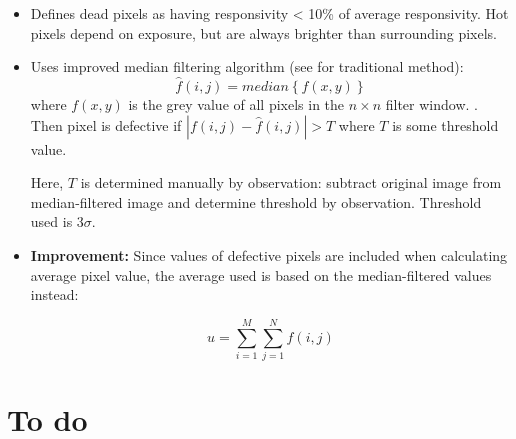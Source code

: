 \documentclass[10pt,fleqn]{article}
\begin{document}
\begin{itemize}
\item
Defines dead pixels as having responsivity < 10\% of average responsivity. Hot pixels depend on exposure, but are always brighter than surrounding pixels.

\item
Uses improved median filtering algorithm (see \cite{Meng2010} for traditional method):
\begin{equation}
\hat{f}(i,j) = median \left\lbrace f(x, y) \right\rbrace
\end{equation}
where $f(x, y)$ is the grey value of all pixels in the $n \times n$ filter window.  . Then pixel is defective if $|f(i, j) - \hat{f}(i, j)| > T$ where $T$ is some threshold value.

Here, $T$ is determined manually by observation: subtract original image from median-filtered image and determine threshold by observation. Threshold used is $3\sigma$.

\item
\textbf{Improvement:} Since values of defective pixels are included when calculating average pixel value, the average used is based on the median-filtered values instead:

\begin{equation}
u = \sum_{i=1}^M \sum_{j=1}^N \hat{f}(i, j)
\end{equation}

\end{itemize}

\hrulefill

\section*{To do}







\newpage
\printbibliography
\end{document}
